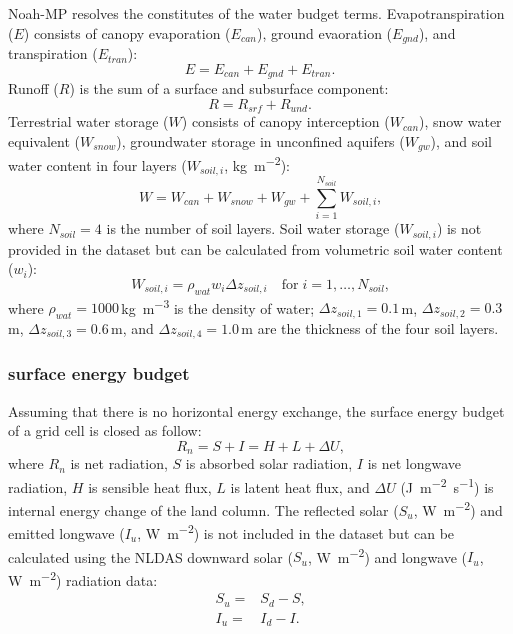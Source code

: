 \documentclass[essd]{copernicus}
\begin{document}
Noah-MP resolves the constitutes of the water budget terms. Evapotranspiration ($E$) consists of canopy evaporation ($E_{can}$), ground evaoration ($E_{gnd}$), and transpiration ($E_{tran}$):
\begin{equation}
    E = E_{can} + E_{gnd} + E_{tran} \text{.}
\end{equation}
Runoff ({$R$}) is the sum of a surface and subsurface component:
\begin{equation}
    R = R_{srf} + R_{und} \text{.}
\end{equation}
Terrestrial water storage ($W$) consists of canopy interception ($W_{can}$), snow water equivalent ($W_{snow}$), groundwater storage in unconfined aquifers ($W_{gw}$), and soil water content in four layers ($W_{soil,i}$,
\unit{kg~m^{-2}}):
\begin{equation}
    W = W_{can} + W_{snow} + W_{gw} + \sum_{i=1}^{N_{soil}} W_{soil,i} \text{,}
\end{equation}
where $N_{soil} = 4$ is the number of soil layers.  Soil water storage ($W_{soil,i}$) is not provided in the dataset but can be calculated from volumetric soil water content ($w_{i}$):
\begin{equation}
    W_{soil,i} = \rho_{wat} w_i \Delta z_{soil,i}
    \quad \text{for} \; i = 1,\dots,N_{soil}
    \text{,} \label{eq:soil-vmc}
\end{equation}
where $\rho_{wat}=1000$\,\unit{kg~m^{-3}} is the density of water; $\Delta z_{soil,1}=0.1$\,\unit{m}, $\Delta z_{soil,2}=0.3$\,\unit{m}, $\Delta z_{soil,3}=0.6$\,\unit{m}, and $\Delta z_{soil,4}=1.0$\,\unit{m} are the thickness of the four soil layers.

\subsubsection{surface energy budget}

Assuming that there is no horizontal energy exchange, the surface energy budget of a grid cell is closed as follow:
\begin{equation}
    R_n = S + I = H + L + \Delta U \text{,} \label{eq:energy-balance}
\end{equation}
where $R_n$ is net radiation, $S$ is absorbed solar radiation, $I$ is net longwave radiation, $H$ is sensible heat flux, $L$ is latent heat flux, and $\Delta U$ (\unit{J~m^{-2}~s^{-1}}) is internal energy change of the land column. The reflected solar ($S_u$, \unit{W~m^{-2}}) and emitted longwave ($I_u$, \unit{W~m^{-2}}) is not included in the dataset but can be calculated using the NLDAS downward solar ($S_u$, \unit{W~m^{-2}}) and
longwave ($I_u$, \unit{W~m^{-2}}) radiation data:
\begin{align}
    S_u = & S_d - S \text{,} \\
    I_u = & I_d - I \text{.}
\end{align}
\end{document}
